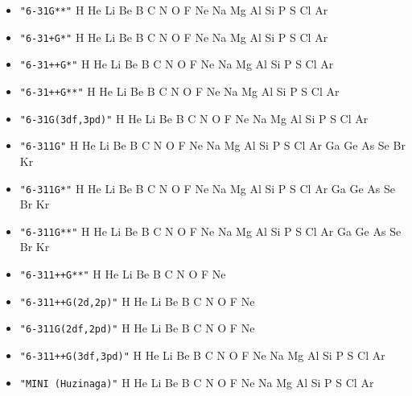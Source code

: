 \begin{itemize}
\item \verb#"6-31G**"# \newline
 H He Li Be B C N O F Ne Na Mg Al Si P S Cl Ar

\item \verb#"6-31+G*"# \newline
 H He Li Be B C N O F Ne Na Mg Al Si P S Cl Ar

\item \verb#"6-31++G*"# \newline
 H He Li Be B C N O F Ne Na Mg Al Si P S Cl Ar

\item \verb#"6-31++G**"# \newline
 H He Li Be B C N O F Ne Na Mg Al Si P S Cl Ar

\item \verb#"6-31G(3df,3pd)"# \newline
 H He Li Be B C N O F Ne Na Mg Al Si P S Cl Ar

\item \verb#"6-311G"# \newline
 H He Li Be B C N O F Ne Na Mg Al Si P S Cl Ar Ga Ge As Se Br Kr

\item \verb#"6-311G*"# \newline
 H He Li Be B C N O F Ne Na Mg Al Si P S Cl Ar Ga Ge As Se Br Kr

\item \verb#"6-311G**"# \newline
 H He Li Be B C N O F Ne Na Mg Al Si P S Cl Ar Ga Ge As Se Br Kr

\item \verb#"6-311++G**"# \newline
 H He Li Be B C N O F Ne

\item \verb#"6-311++G(2d,2p)"# \newline
 H He Li Be B C N O F Ne

\item \verb#"6-311G(2df,2pd)"# \newline
 H He Li Be B C N O F Ne

\item \verb#"6-311++G(3df,3pd)"# \newline
 H He Li Be B C N O F Ne Na Mg Al Si P S Cl Ar

\item \verb#"MINI (Huzinaga)"# \newline
 H He Li Be B C N O F Ne Na Mg Al Si P S Cl Ar


\end{itemize}
